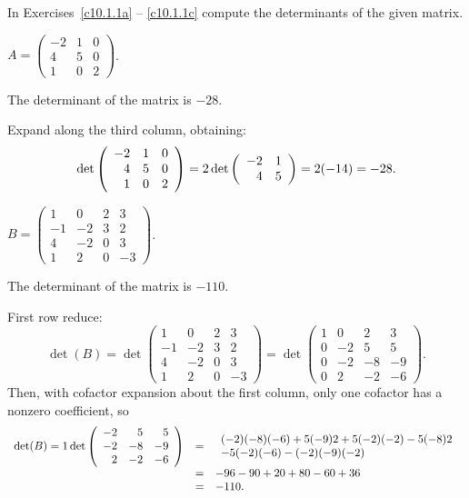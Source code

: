 \documentclass{ximera}
\begin{document}
\noindent  In Exercises~\ref{c10.1.1a} -- \ref{c10.1.1c} compute the 
determinants of the given matrix.
\begin{exercise} \label{c10.1.1a}
$A = \left(\begin{array}{rrr} -2 & 1 & 0 \\ 4 & 5& 0 \\ 1 & 0 & 2
\end{array} \right)$.

\begin{solution}

\ans The determinant of the matrix is $-28$.

\soln Expand along the third column, obtaining:
\[
\det\left(\begin{array}{rrr} -2 & 1 & 0 \\ 4 & 5 & 0 \\ 1 & 0 & 2\end{array}\right) = 2\det\left(\begin{array}{rr} -2 & 1\\ 4 &5\end{array}\right)
= 2(-14) = -28.
\]

\end{solution}
\end{exercise} 
\begin{exercise} \label{c10.1.1b}
$B = \left(\begin{array}{rrrr} 1 & 0 & 2 & 3 \\ -1 & -2 & 3 & 2
\\ 4 & -2 & 0 & 3 \\ 1 & 2 & 0 & -3 \end{array} \right)$.

\begin{solution}

\ans The determinant of the matrix is $-110$.

\soln First row reduce:
\[
\det(B)=\det\left(\begin{array}{rrrr}
1 & 0 & 2 & 3 \\ 
-1 & -2 & 3 & 2 \\
4 & -2 & 0 & 3 \\
1 & 2 & 0 & -3 \end{array}\right) =
\det\left(\begin{array}{rrrr}
1 & 0 & 2 & 3 \\ 
0 & -2 & 5 & 5 \\
0 & -2 & -8 & -9 \\
0 & 2 & -2 & -6 \end{array}\right).
\]
Then, with cofactor expansion about the first column, only one cofactor has a nonzero coefficient, so 
\[ \begin{array}{rcl}
\det(B) = 1\det\left(\begin{array}{rrr} -2 & 5 & 5 \\ -2 & -8 & -9 \\ 2 & -2 & -6\end{array}\right) & = &
\begin{array}{l}
(-2)(-8)(-6) + 5(-9)2 + 5(-2)(-2) - 5(-8)2 \\
- 5(-2)(-6) - (-2)(-9)(-2) \end{array} \\
& = & -96 - 90 + 20 + 80 - 60 + 36 \\
& = & -110.
\end{array}
\]

\end{solution}
\end{exercise}
\end{document}
